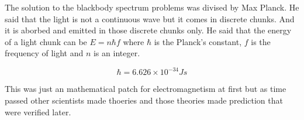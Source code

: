 The solution to the blackbody spectrum problems was divised by Max Planck.
He said that the light is not a continuous wave but it comes in discrete chunks. 
And it is aborbed and emitted in those discrete chunks only.
He said that the energy of a light chunk can be $E = n \hbar f$ where $\hbar$ is the Planck's constant, 
$f$ is the frequency of light and  $n$ is an integer.

$$ \hbar = 6.626 \times 10^{-34} J s $$


This was just an mathematical patch for electromagnetism at first but as time passed other
scientists made thoeries and those theories made prediction that were verified later.
